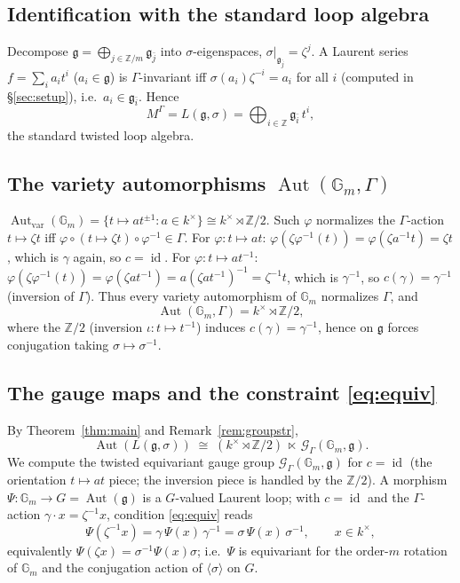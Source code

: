 \documentclass{amsart}
\theoremstyle{definition}
\DeclareMathOperator{\Aut}{Aut}
\DeclareMathOperator{\id}{id}
\newcommand{\Gm}{\mathbb{G}_m}
\newcommand{\g}{\mathfrak{g}}
\newcommand{\Z}{\mathbb{Z}}
\newcommand{\M}{M}
\begin{document}
\subsection{Identification with the standard loop algebra}
Decompose $\g=\bigoplus_{j\in\Z/m}\g_{\bar j}$ into $\sigma$-eigenspaces,
$\sigma|_{\g_{\bar j}}=\zeta^{j}$.  A Laurent series $f=\sum_i a_i t^i$
($a_i\in\g$) is $\Gamma$-invariant iff
$\sigma(a_i)\zeta^{-i}=a_i$ for all $i$ (computed in
\S\ref{sec:setup}), i.e.\ $a_i\in\g_{\bar i}$.  Hence
\[
\M^\Gamma=L(\g,\sigma)=\bigoplus_{i\in\Z}\g_{\bar i}\,t^{i},
\]
the standard twisted loop algebra.

\subsection{The variety automorphisms $\Aut(\Gm,\Gamma)$}
$\Aut_{\mathrm{var}}(\Gm)=\{t\mapsto at^{\pm1}:a\in k^\times\}\cong
k^\times\rtimes\Z/2$.  Such $\varphi$ normalizes the $\Gamma$-action
$t\mapsto\zeta t$ iff $\varphi\circ(t\mapsto\zeta t)\circ\varphi^{-1}\in
\Gamma$.  For $\varphi\colon t\mapsto at$: $\varphi(\zeta\varphi^{-1}(t))
=\varphi(\zeta a^{-1}t)=\zeta t$, which is $\gamma$ again, so $c=\id$.  For
$\varphi\colon t\mapsto at^{-1}$:
$\varphi(\zeta\varphi^{-1}(t))=\varphi(\zeta a t^{-1})
=a(\zeta a t^{-1})^{-1}=\zeta^{-1}t$, which is $\gamma^{-1}$, so
$c(\gamma)=\gamma^{-1}$ (inversion of $\Gamma$).  Thus every variety
automorphism of $\Gm$ normalizes $\Gamma$, and
\[
\Aut(\Gm,\Gamma)=k^\times\rtimes\Z/2,
\]
where the $\Z/2$ (inversion $\iota\colon t\mapsto t^{-1}$) induces
$c(\gamma)=\gamma^{-1}$, hence on $\g$ forces conjugation taking
$\sigma\mapsto\sigma^{-1}$.

\subsection{The gauge maps and the constraint \eqref{eq:equiv}}
By Theorem~\ref{thm:main} and Remark~\ref{rem:groupstr},
\[
\Aut(L(\g,\sigma))\;\cong\;
(k^\times\rtimes\Z/2)\ \ltimes\ \mathcal G_\Gamma(\Gm,\g).
\]
We compute the twisted equivariant gauge group $\mathcal G_\Gamma(\Gm,\g)$
for $c=\id$ (the orientation $t\mapsto at$ piece; the inversion piece is
handled by the $\Z/2$).  A morphism $\Psi\colon\Gm\to G=\Aut(\g)$ is a
$G$-valued Laurent loop; with $c=\id$ and the $\Gamma$-action
$\gamma\cdot x=\zeta^{-1}x$, condition \eqref{eq:equiv} reads
\[
\Psi(\zeta^{-1} x)=\gamma\,\Psi(x)\,\gamma^{-1}=\sigma\,\Psi(x)\,\sigma^{-1},
\qquad x\in k^\times,
\]
equivalently $\Psi(\zeta x)=\sigma^{-1}\Psi(x)\sigma$; i.e.\ $\Psi$ is
equivariant for the order-$m$ rotation of $\Gm$ and the conjugation action
of $\langle\sigma\rangle$ on $G$.
\end{document}
